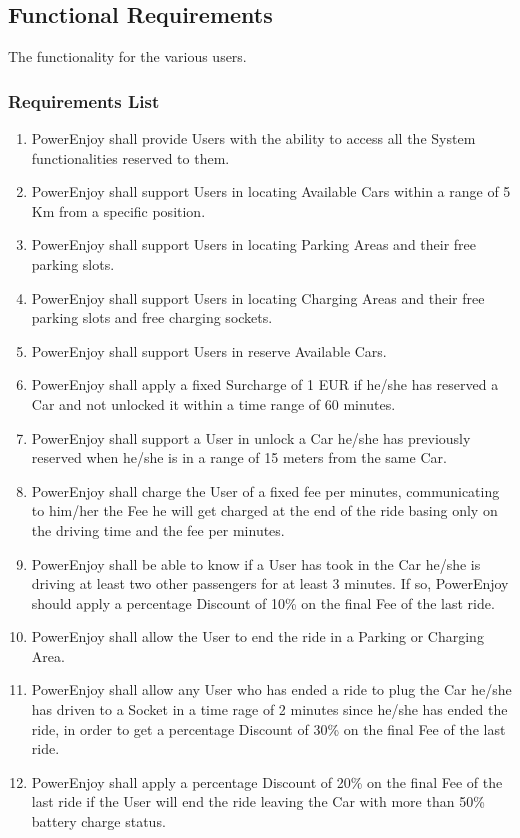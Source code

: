 \subsection{Functional Requirements}
The functionality for the various users.
\subsubsection {Requirements List}
\begin{enumerate}[label=R\arabic*]
\item PowerEnjoy shall provide Users with the ability to access all the System functionalities reserved to them.
\item PowerEnjoy shall support Users in locating Available Cars within a range of 5 Km from a specific position.
\item PowerEnjoy shall support Users in locating Parking Areas and their free parking slots.
\item PowerEnjoy shall support Users in locating Charging Areas and their free parking slots and free charging sockets.
\item PowerEnjoy shall support Users in reserve Available Cars.
\item PowerEnjoy shall apply a fixed Surcharge of 1 EUR if he/she has reserved a Car and not unlocked it within a time range of 60 minutes.
\item PowerEnjoy shall support a User in unlock a Car he/she has previously reserved when he/she is in a range of 15 meters from the same Car.
\item PowerEnjoy shall charge the User of a fixed fee per minutes, communicating to him/her the Fee he will get charged at the end of the ride basing only on the driving time and the fee per minutes.
\item PowerEnjoy shall be able to know if a User has took in the Car he/she is driving at least two other passengers for at least 3 minutes. If so, PowerEnjoy should apply a percentage Discount of 10\% on the final Fee of the last ride.
\item PowerEnjoy shall allow the User to end the ride in a Parking or Charging Area. 
\item PowerEnjoy shall allow any User who has ended a ride to plug the Car he/she has driven to a Socket in a time rage of 2 minutes since he/she has ended the ride, in order to get a percentage Discount of 30\% on the final Fee of the last ride.
\item PowerEnjoy shall apply a percentage Discount of 20\% on the final Fee of the last ride if the User will end the ride leaving the Car with more than 50\% battery charge status.

\end{enumerate}
